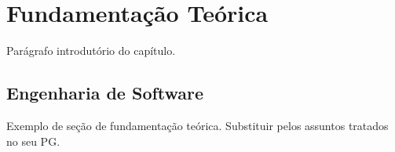 
\section{Fundamentação Teórica}
\label{sec-fundamentacao}

Parágrafo introdutório do capítulo.



\subsection{Engenharia de Software}
\label{sec-fundamentacao-engsoft}

Exemplo de seção de fundamentação teórica. Substituir pelos assuntos tratados no seu PG.